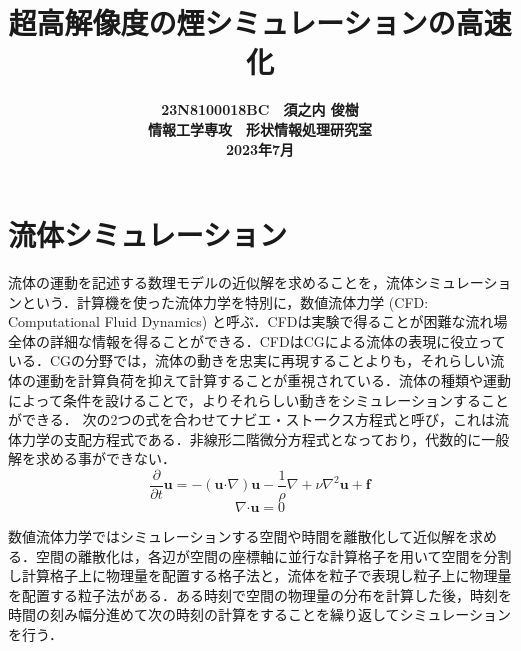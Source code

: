 \documentclass[10pt,a4paper,notitlepage,oneside,twocolumn]{abst_jsarticle}
\title{
{\bf 超高解像度の煙シミュレーションの高速化}
}
\author{\begin{center}
{\large {\bf 23N8100018BC　須之内 俊樹}}\\
{\large {\bf 情報工学専攻　形状情報処理研究室}}\\
{\large {\bf 2023年7月}}
\end{center}}
\date{}
\begin{document}
\maketitle
\section{流体シミュレーション} \label{sec:intro}
流体の運動を記述する数理モデルの近似解を求めることを，流体シミュレーションという．計算機を使った流体力学を特別に，数値流体力学 (CFD: Computational Fluid Dynamics) と呼ぶ．CFDは実験で得ることが困難な流れ場全体の詳細な情報を得ることができる．CFDはCGによる流体の表現に役立っている．CGの分野では，流体の動きを忠実に再現することよりも，それらしい流体の運動を計算負荷を抑えて計算することが重視されている．流体の種類や運動によって条件を設けることで，よりそれらしい動きをシミュレーションすることができる．
次の2つの式を合わせてナビエ・ストークス方程式と呼び，これは流体力学の支配方程式である．非線形二階微分方程式となっており，代数的に一般解を求める事ができない．
\begin{equation}\label{eq:Navie}
\frac{\partial}{\partial t}\bm{u} = - (\bm{u} \boldsymbol{\cdot}\nabla) \bm{u} - \frac{1}{\rho}\nabla + \nu\nabla^2\bm{u} + \bm{f}
\end{equation}
$$\nabla\boldsymbol{\cdot}\bm{u} = 0$$

数値流体力学ではシミュレーションする空間や時間を離散化して近似解を求める．空間の離散化は，各辺が空間の座標軸に並行な計算格子を用いて空間を分割し計算格子上に物理量を配置する格子法と，流体を粒子で表現し粒子上に物理量を配置する粒子法がある．ある時刻で空間の物理量の分布を計算した後，時刻を時間の刻み幅分進めて次の時刻の計算をすることを繰り返してシミュレーションを行う．
\end{document}
